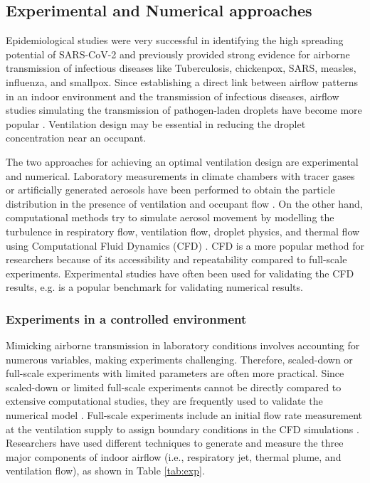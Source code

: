 \documentclass[a4paper,12pt]{elsarticle}
\begin{document}
\subsection{Experimental and Numerical approaches}

Epidemiological studies were very successful in identifying the high spreading potential of SARS-CoV-2 \cite{rothan2020epidemiology} and previously provided strong evidence for airborne transmission of infectious diseases like Tuberculosis, chickenpox, SARS, measles, influenza, and smallpox. Since establishing a direct link between airflow patterns in an indoor environment and the transmission of infectious diseases, airflow studies simulating the transmission of pathogen-laden droplets have become more popular \cite{li2007role}. Ventilation design may be essential in reducing the droplet concentration near an occupant. 

The two approaches for achieving an optimal ventilation design are experimental and numerical. Laboratory measurements in climate chambers with tracer gases or artificially generated aerosols have been performed to obtain the particle distribution in the presence of ventilation and occupant flow \cite{zhou2021experimental}. On the other hand, computational methods try to simulate aerosol movement by modelling the turbulence in respiratory flow, ventilation flow, droplet physics, and thermal flow using Computational Fluid Dynamics (CFD) \cite{wang2022evaluation}. CFD is a more popular method for researchers because of its accessibility and repeatability compared to full-scale experiments. Experimental studies have often been used for validating the CFD results, e.g. \cite{yin2009experimental} is a popular benchmark for validating numerical results.

\subsubsection{Experiments in a controlled environment}

Mimicking airborne transmission in laboratory conditions involves accounting for numerous variables, making experiments challenging. Therefore, scaled-down \cite{poussou2010flow} or full-scale experiments with limited parameters \cite{luo2022role} are often more practical. Since scaled-down or limited full-scale experiments cannot be directly compared to extensive computational studies, they are frequently used to validate the numerical model \cite{li2020investigating,qin2023transmission,cortellessa2023effectiveness}. Full-scale experiments include an initial flow rate measurement at the ventilation supply to assign boundary conditions in the CFD simulations \cite{romano2015numerical}. Researchers have used different techniques to generate and measure the three major components of indoor airflow (i.e., respiratory jet, thermal plume, and ventilation flow), as shown in Table \ref{tab:exp}.
\end{document}
